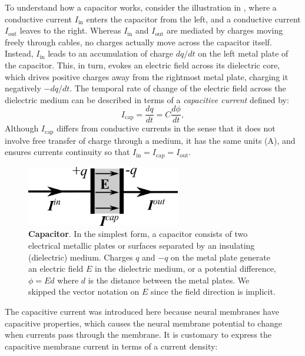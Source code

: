 To understand how a capacitor works, consider the illustration in , where a conductive current $I_\text{in}$ enters the capacitor from the left, and a conductive current $I_\text{out}$ leaves to the right. Whereas $I_\text{in}$ and $I_\text{out}$ are mediated by charges moving freely through cables, no charges actually move across the capacitor itself. Instead, $I_\text{in}$ leads to an accumulation of charge $dq/dt$ on the left metal plate of the capacitor. This, in turn, evokes an electric field across its dielectric core, which drives positive charges away from the rightmost metal plate, charging it negatively $-dq/dt$. The temporal rate of change of the electric field across the dielectric medium can be described in terms of a \textit{capacitive current} defined by:
\begin{equation}
I_\text{cap} = \frac{dq}{dt} = C\frac{d\phi}{dt},
\label{eq:Basics:Icap}
\end{equation}
Although $I_\text{cap}$ differs from conductive currents in the sense that it does not involve free transfer of charge through a medium, it has the same units (A), and ensures currents continuity so that $I_\text{in} = I_\text{cap} = I_\text{out}$. 

\begin{figure}[!ht]
\begin{center}
\includegraphics[width=0.6\textwidth]{Figures/Basics/Capacitor.png}
\end{center}
\caption{{\bf Capacitor}.  In the simplest form, a capacitor consists of two electrical metallic plates or surfaces separated by an insulating (dielectric) medium. Charges $q$ and $-q$ on the metal plate generate an electric field $E$ in the dielectric medium, or a potential difference, $\phi = Ed$ where $d$ is the distance between the metal plates. We skipped the vector notation on $E$ since the field direction is implicit.
}
\label{fig:Basics:Capacitor}
\end{figure}

The capacitive current was introduced here because neural membranes have capacitive properties, which causes the neural membrane potential to change when currents pass through the membrane. It is customary to express the capacitive membrane current in terms of a current density:

